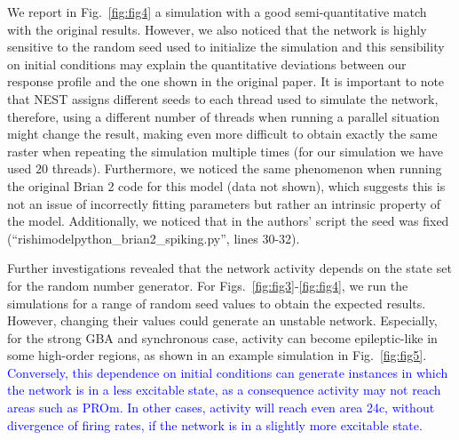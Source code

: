 We report in Fig.~\ref{fig:fig4} a simulation with a good semi-quantitative match with the original results. However, we also noticed that the network is highly sensitive to the random seed used to initialize the simulation and this sensibility on initial conditions may explain the quantitative deviations between our response profile and the one shown in the original paper. It is important to note that NEST assigns different seeds to each thread used to simulate the network, therefore, using a different number of threads when running a parallel situation might change the result, making even more difficult to obtain exactly the same raster when repeating the simulation multiple times (for our simulation we have used $20$ threads). Furthermore, we noticed the same phenomenon  when running the original Brian 2 code for this model (data not shown), which suggests this is not an issue of incorrectly fitting parameters but rather an intrinsic property of the model. Additionally, we noticed that in the authors' script the seed was fixed (``rishimodelpython\_brian2\_spiking.py'', lines 30-32).



Further investigations revealed that the network activity depends on the state set for the random number generator. For Figs.~\ref{fig:fig3}-\ref{fig:fig4}, we run the simulations for a range of random seed values to obtain the expected results. However, changing their values could generate an unstable network. Especially, for the strong GBA and synchronous case, activity can become epileptic-like in some high-order regions, as shown in an example simulation in Fig.~\ref{fig:fig5}. \textcolor{blue}{Conversely, this dependence on initial conditions can generate instances in which the network is in a less excitable state, as a consequence activity may not reach areas such as PROm. In other cases, activity will reach even area 24c, without divergence of firing rates, if the network is in a slightly more excitable state.}

